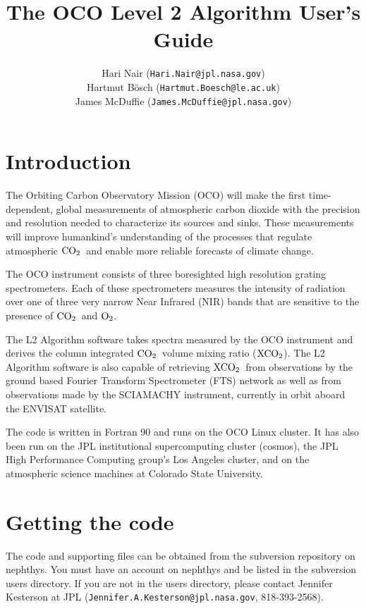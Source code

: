 \documentclass{article}
\author{Hari Nair (\texttt{Hari.Nair@jpl.nasa.gov})\\
        Hartmut B\"osch (\texttt{Hartmut.Boesch@le.ac.uk})\\
	James McDuffie (\texttt{James.McDuffie@jpl.nasa.gov})
}
\title{The OCO Level 2 Algorithm User's Guide}
\newcommand{\COtwo}{\ensuremath{\rm{CO}_2}}
\newcommand{\Otwo}{\ensuremath{\rm{O}_2}}
\newcommand{\XCOtwo}{\ensuremath{\rm{XCO}_2}}
\begin{document}
\maketitle

\tableofcontents

\pagestyle{headings}

\section{Introduction}

The Orbiting Carbon Observatory Mission (OCO) will make the first
time-dependent, global measurements of atmospheric carbon dioxide with
the precision and resolution needed to characterize its sources and
sinks. These measurements will improve humankind's understanding of
the processes that regulate atmospheric \COtwo\ and enable more
reliable forecasts of climate change.

The OCO instrument consists of three boresighted high resolution
grating spectrometers.  Each of these spectrometers measures the
intensity of radiation over one of three very narrow Near Infrared
(NIR) bands that are sensitive to the presence of \COtwo\ and \Otwo.

The L2 Algorithm software takes spectra measured by the OCO instrument
and derives the column integrated \COtwo\ volume mixing ratio
(\XCOtwo).  The L2 Algorithm software is also capable of retrieving
\XCOtwo\ from observations by the ground based Fourier Transform
Spectrometer (FTS) network as well as from observations made by the
SCIAMACHY instrument, currently in orbit aboard the ENVISAT satellite.

The code is written in Fortran 90 and runs on the OCO Linux cluster.
It has also been run on the JPL institutional supercomputing cluster
(cosmos), the JPL High Performance Computing group's Los Angeles
cluster, and on the atmospheric science machines at Colorado State
University.

\section{Getting the code}

The code and supporting files can be obtained from the subversion
repository on nephthys.  You must have an account on nephthys and be
listed in the subversion users directory.  If you are not in the users
directory, please contact Jennifer Kesterson at JPL
(\texttt{Jennifer.A.Kesterson@jpl.nasa.gov}, 818-393-2568).
\end{document}
